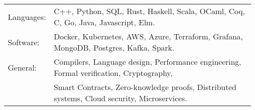 \begin{tabular}{l l}
  Languages: & C++, Python, SQL, Rust, Haskell, Scala, OCaml, Coq, C, Go, Java, Javascript, Elm. \\
  Software: & Docker, Kubernetes, AWS, Azure, Terraform, Grafana, MongoDB, Postgres, Kafka, Spark. \\
  General: & Compilers, Language design, Performance engineering, Formal verification, Cryptography, \\
         & Smart Contracts, Zero-knowledge proofs, Distributed systems, Cloud security, Microservices. \\
\end{tabular}



